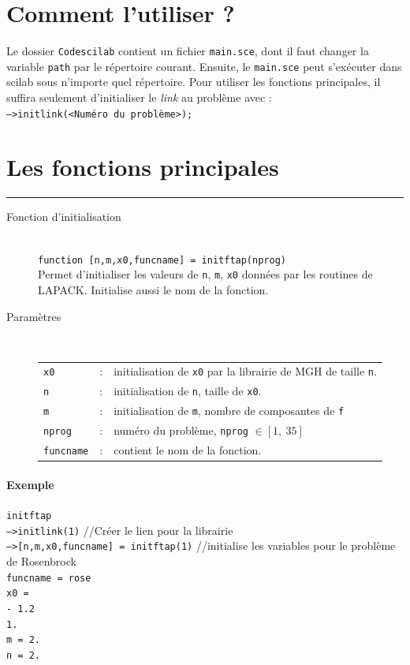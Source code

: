 \section{Comment l'utiliser ?}

Le dossier {\tt Codescilab} contient un fichier {\tt main.sce}, dont il faut changer la variable {\tt path} par le répertoire courant. 
Ensuite, le {\tt main.sce} peut s'exécuter dans scilab sous n'importe quel répertoire. Pour utiliser
les fonctions principales, il suffira seulement d'initialiser le {\it link} au problème avec :\\
{\tt -->initlink(<Numéro du probl\`eme>);}\\



\section{Les fonctions principales}



\rule{\linewidth}{1pt}
\begin{description}
  \item[Fonction d'initialisation] \hfill \\
 {\tt function [n,m,x0,funcname] = initftap(nprog)} \\
Permet d'initialiser les valeurs de {\tt n}, {\tt m}, {\tt x0} données par les routines de LAPACK. Initialise aussi 
le nom de la fonction.
  \item[Paramètres] \hfill \\
\begin{tabular}{lll}
{\tt x0}&:&initialisation de {\tt x0} par la librairie de MGH de taille {\tt n}.\\
{\tt n}&:&initialisation de {\tt n}, taille de {\tt x0}.\\
{\tt m}&:&initialisation de {\tt m}, nombre de composantes de {\tt f}\\
{\tt nprog}&:&numéro du problème, {\tt nprog} $\in [1,\ 35]$ \\ %
{\tt funcname}&:& contient le nom de la fonction.\\
\end{tabular}
\end{description}
\paragraph{Exemple}{}{\tt initftap}\\
{\tt -->initlink(1)} //Créer le lien pour la librairie\\
{\tt -->[n,m,x0,funcname] = initftap(1)} //initialise les variables pour le problème de Rosenbrock\\
{\tt  funcname  =  rose   \\
 x0  =\\
  - 1.2  \\
    1.   \\
 m  =  2. \\ 
 n  =  2.\\}\\


